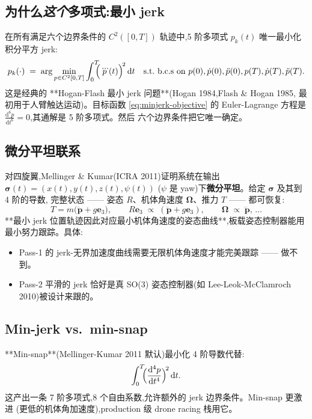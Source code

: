 \documentclass[UTF8, 11pt]{ctexart}
\newcommand{\dt}{\,\mathrm{d}t}
\begin{document}
\subsection{为什么\emph{这个}多项式:最小 jerk}

在所有满足六个边界条件的 $C^2([0,T])$ 轨迹中,5 阶多项式 $p_k(t)$ 唯一最小化
积分平方 jerk:
\begin{equation}\label{eq:minjerk-objective}
p_k(\cdot) \;=\; \arg\min_{p \in C^2[0,T]} \int_0^T \!\!\!\Bigl(\dddot{p}(t)\Bigr)^{\!2} \dt \quad\text{s.t.\ b.c.s\ on }p(0),\dot{p}(0),\ddot{p}(0),p(T),\dot{p}(T),\ddot{p}(T).
\end{equation}
这是经典的 **Hogan-Flash 最小 jerk 问题**(Hogan 1984,Flash \& Hogan 1985,
最初用于人臂触达运动)。目标函数 \eqref{eq:minjerk-objective} 的 Euler-Lagrange
方程是 $\frac{\mathrm{d}^6 p}{\mathrm{d}t^6} = 0$,其通解是 5 阶多项式。然后
六个边界条件把它唯一确定。

\subsection{微分平坦联系}

对四旋翼,Mellinger \& Kumar(ICRA 2011)证明系统在输出 $\bm{\sigma}(t) = (x(t), y(t), z(t), \psi(t))$
($\psi$ 是 yaw)下\textbf{微分平坦}。给定 $\bm{\sigma}$ 及其到 4 阶的导数,
完整状态 —— 姿态 $R$、机体角速度 $\bm{\Omega}$、推力 $T$ —— 都可恢复:
\begin{equation}
T = m\bigl(\ddot{\bm{p}} + g \bm{e}_3\bigr), \qquad R \bm{e}_3 \;\propto\; (\ddot{\bm{p}} + g\bm{e}_3), \qquad \bm{\Omega} \;\propto\; \dddot{\bm{p}},\,\ldots
\end{equation}
**最小 jerk 位置轨迹因此对应最小机体角速度的姿态曲线**,板载姿态控制器能用
最小努力跟踪。具体:
\begin{itemize}
  \item Pass-1 的 jerk-无界加速度曲线需要无限机体角速度才能完美跟踪 —— 做不到。
  \item Pass-2 平滑的 jerk 恰好是真 SO(3) 姿态控制器(如 Lee-Leok-McClamroch 2010)被设计来跟的。
\end{itemize}

\subsection{Min-jerk vs.\ min-snap}

**Min-snap**(Mellinger-Kumar 2011 默认)最小化 4 阶导数代替:
\begin{equation}
\int_0^T \!\!\Bigl(\frac{\mathrm{d}^4 p}{\mathrm{d}t^4}\Bigr)^{\!2}\dt.
\end{equation}
这产出一条 7 阶多项式,8 个自由系数,允许额外的 jerk 边界条件。Min-snap 更激进
(更低的机体角加速度),production 级 drone racing 栈用它。
\end{document}
